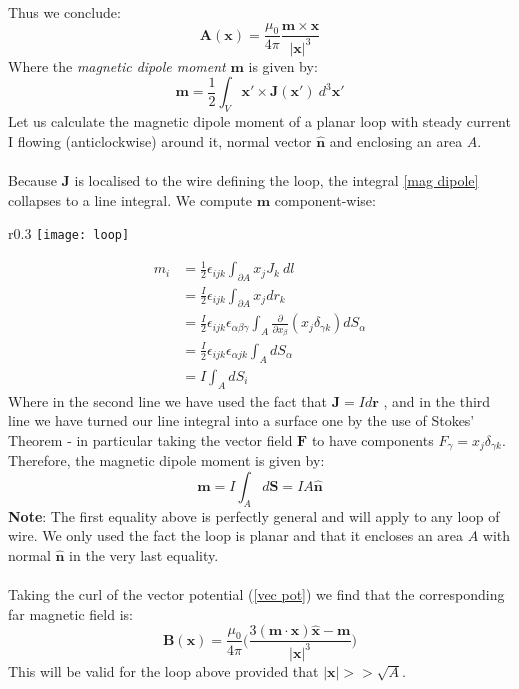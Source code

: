 \documentclass[a4paper]{article}
\numberwithin{equation}{section}
\begin{document}
Thus we conclude:
\begin{equation} \label{vec pot}
\mathbf{A}(\mathbf{x}) = \frac{\mu_0}{4 \pi} \frac{\mathbf{m} \times \mathbf{x}}{|\mathbf{x}|^3}
\end{equation}
Where the \textit{magnetic dipole moment} $\mathbf{m}$ is given by:
\begin{equation} \label{mag dipole}
\mathbf{m} = \frac{1}{2} \int_V \mathbf{x}' \times \mathbf{J}(\mathbf{x}') \ d^3 \mathbf{x}'
\end{equation}
Let us calculate the magnetic dipole moment of a planar loop with steady current I flowing (anticlockwise) around it, normal vector $\hat{\mathbf{n}}$ and enclosing an area $A$.\\
\\
Because $\mathbf{J}$ is localised to the wire defining the loop, the integral \ref{mag dipole} collapses to a line integral. We compute $\mathbf{m}$ component-wise:
\begin{wrapfigure}[4]{r}{0.3\textwidth}
	\texttt{[image: loop]}
\end{wrapfigure}
\begin{align*}
m_i &= \frac{1}{2}\epsilon_{ijk}\int_{\partial A}x_j J_k \ dl \\
&= \frac{I}{2}\epsilon_{ijk}\int_{\partial A}x_jdr_k \\
&= \frac{I}{2}\epsilon_{ijk} \epsilon_{\alpha \beta \gamma}\int_{A} \frac{\partial}{\partial x_\beta}(x_j \delta_{\gamma k}) dS_\alpha \\
&=\frac{I}{2} \epsilon_{ijk} \epsilon_{\alpha jk} \int_{A} dS_\alpha \\
&=I \int_A dS_i
\end{align*}
Where in the second line we have used the fact that $\mathbf{J} = I d\mathbf{r}$ , and in the third line we have turned our line integral into a surface one by the use of Stokes' Theorem - in particular taking the vector field $\mathbf{F}$ to have components $F_\gamma=x_j \delta_{\gamma k}$. Therefore, the magnetic dipole moment is given by:
\begin{equation}
\mathbf{m}=I\int_A d\mathbf{S} = IA \hat{\mathbf{n}}
\end{equation}
\textbf{Note}: The first equality above is perfectly general and will apply to any loop of wire. We only used the fact the loop is planar and that it encloses an area $A$ with normal $\hat{\mathbf{n}}$ in the very last equality.\\
\\
Taking the curl of the vector potential (\ref{vec pot}) we find that the corresponding far magnetic field is:
\begin{equation}
\mathbf{B}(\mathbf{x}) = \frac{\mu_0}{4 \pi} \bigg( \frac{3(\mathbf{m}\cdot \mathbf{x})\hat{\mathbf{x}}- \mathbf{m}}{|\mathbf{x}|^3} \bigg)
\end{equation}
This will be valid for the loop above provided that $|\mathbf{x}| >> \sqrt{A}$.
\end{document}
